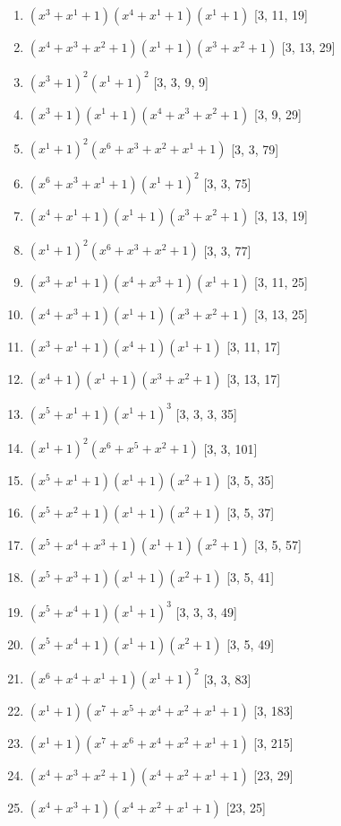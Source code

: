 \documentclass[10pt,twocolumn]{article}
\begin{document}
\begin{enumerate}
\item $(x^{3} + x^{1} + 1)(x^{4} + x^{1} + 1)(x^{1} + 1)$  [3, 11, 19]
\item $(x^{4} + x^{3} + x^{2} + 1)(x^{1} + 1)(x^{3} + x^{2} + 1)$  [3, 13, 29]
\item $(x^{3} + 1)^{2}(x^{1} + 1)^{2}$  [3, 3, 9, 9]
\item $(x^{3} + 1)(x^{1} + 1)(x^{4} + x^{3} + x^{2} + 1)$  [3, 9, 29]
\item $(x^{1} + 1)^{2}(x^{6} + x^{3} + x^{2} + x^{1} + 1)$  [3, 3, 79]
\item $(x^{6} + x^{3} + x^{1} + 1)(x^{1} + 1)^{2}$  [3, 3, 75]
\item $(x^{4} + x^{1} + 1)(x^{1} + 1)(x^{3} + x^{2} + 1)$  [3, 13, 19]
\item $(x^{1} + 1)^{2}(x^{6} + x^{3} + x^{2} + 1)$  [3, 3, 77]
\item $(x^{3} + x^{1} + 1)(x^{4} + x^{3} + 1)(x^{1} + 1)$  [3, 11, 25]
\item $(x^{4} + x^{3} + 1)(x^{1} + 1)(x^{3} + x^{2} + 1)$  [3, 13, 25]
\item $(x^{3} + x^{1} + 1)(x^{4} + 1)(x^{1} + 1)$  [3, 11, 17]
\item $(x^{4} + 1)(x^{1} + 1)(x^{3} + x^{2} + 1)$  [3, 13, 17]
\item $(x^{5} + x^{1} + 1)(x^{1} + 1)^{3}$  [3, 3, 3, 35]
\item $(x^{1} + 1)^{2}(x^{6} + x^{5} + x^{2} + 1)$  [3, 3, 101]
\item $(x^{5} + x^{1} + 1)(x^{1} + 1)(x^{2} + 1)$  [3, 5, 35]
\item $(x^{5} + x^{2} + 1)(x^{1} + 1)(x^{2} + 1)$  [3, 5, 37]
\item $(x^{5} + x^{4} + x^{3} + 1)(x^{1} + 1)(x^{2} + 1)$  [3, 5, 57]
\item $(x^{5} + x^{3} + 1)(x^{1} + 1)(x^{2} + 1)$  [3, 5, 41]
\item $(x^{5} + x^{4} + 1)(x^{1} + 1)^{3}$  [3, 3, 3, 49]
\item $(x^{5} + x^{4} + 1)(x^{1} + 1)(x^{2} + 1)$  [3, 5, 49]
\item $(x^{6} + x^{4} + x^{1} + 1)(x^{1} + 1)^{2}$  [3, 3, 83]
\item $(x^{1} + 1)(x^{7} + x^{5} + x^{4} + x^{2} + x^{1} + 1)$  [3, 183]
\item $(x^{1} + 1)(x^{7} + x^{6} + x^{4} + x^{2} + x^{1} + 1)$  [3, 215]
\item $(x^{4} + x^{3} + x^{2} + 1)(x^{4} + x^{2} + x^{1} + 1)$  [23, 29]
\item $(x^{4} + x^{3} + 1)(x^{4} + x^{2} + x^{1} + 1)$  [23, 25]

\end{enumerate}
\end{document}
